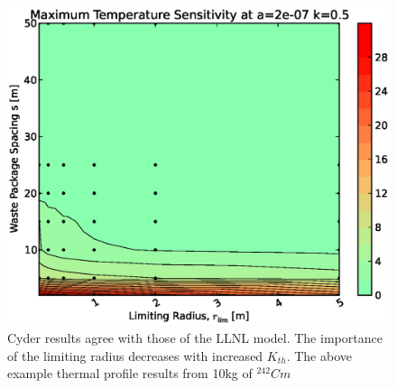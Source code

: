 \begin{figure}[htbp!]
\begin{center}
\includegraphics[width=\columnwidth]{./thermal_demonstration/spacing/rs.eps}
\end{center}
\caption[$\alpha_{th}$ vs. $r_{lim}$ Sensitivity in Cyder]
{Cyder results agree with 
those of the LLNL model. The importance of the limiting radius decreases with 
increased $K_{th}$. The above example thermal profile results from 10kg of 
$^{242}Cm$}
\label{fig:rs}
\end{figure}
